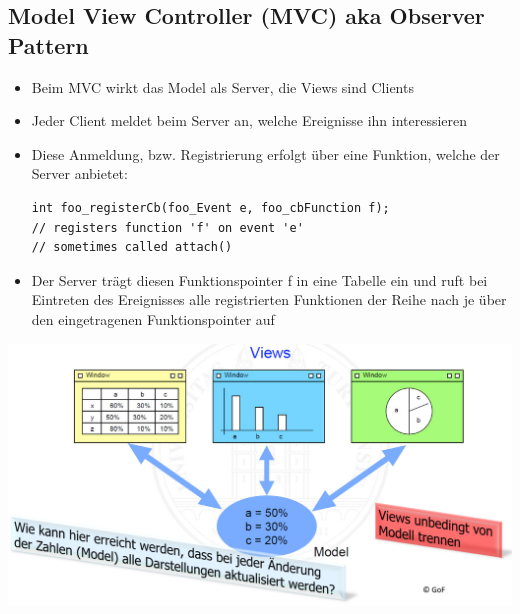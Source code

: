 \subsection{Model View Controller (MVC) aka Observer Pattern}
\begin{multicols}{2}
	\begin{itemize}
		\item Beim MVC wirkt das Model als Server, die Views sind Clients
		\item Jeder Client meldet beim Server an, welche Ereignisse ihn interessieren
		\item Diese Anmeldung, bzw. Registrierung erfolgt über eine Funktion, welche der Server anbietet:
		\begin{lstlisting}[style=C]
int foo_registerCb(foo_Event e, foo_cbFunction f);
// registers function 'f' on event 'e'
// sometimes called attach()
		\end{lstlisting}
		\item Der Server trägt diesen Funktionspointer f in eine Tabelle ein und ruft bei Eintreten des Ereignisses alle registrierten Funktionen der Reihe nach je über den eingetragenen Funktionspointer auf
	\end{itemize}
\columnbreak
	\includegraphics[width=\linewidth]{images/EventBasedSystems/MVC}
\end{multicols}

